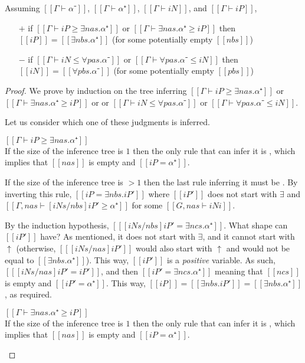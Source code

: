 \begin{corollary}
\begin{lemma}
  \label{lemma:var-subt}
  Assuming $[[Γ ⊢  α⁻]]$, $[[Γ ⊢ α⁺]]$, $[[Γ ⊢ iN]]$, and $[[Γ ⊢ iP]]$,
  \begin{itemize}
  \item[$+$] if $[[Γ ⊢ iP ≥ ∃nas.α⁺]]$ or $[[Γ ⊢ ∃nas.α⁺ ≥ iP ]]$ then $[[iP]] = [[∃nbs.α⁺]]$ (for some potentially empty $[[nbs]]$)
  \item[$-$] if $[[Γ ⊢ iN ≤ ∀pas.α⁻]]$ or $[[Γ ⊢ ∀pas.α⁻ ≤ iN ]]$ then $[[iN]] = [[∀pbs.α⁻]]$ (for some potentially empty $[[pbs]]$)
  \end{itemize}
\end{lemma}
\begin{proof}
  We prove by induction on the tree
  inferring $[[Γ ⊢ iP ≥ ∃nas.α⁺]]$ or $[[Γ ⊢ ∃nas.α⁺ ≥ iP ]]$ or
  or $[[Γ ⊢ iN ≤ ∀pas.α⁻]]$ or $[[Γ ⊢ ∀pas.α⁻ ≤ iN ]]$.

  Let us consider which one of these judgments is inferred.
  \begin{caseof}
  \item $[[Γ ⊢ iP ≥ ∃nas.α⁺]]$\\
    If the size of the inference tree is $1$ then the only rule that can infer
    it is , which
    implies that $[[nas]]$ is empty and $[[iP = α⁺]]$.

    If the size of the inference tree is $>1$ then the last rule inferring
    it must be . By inverting this rule,
    $[[iP = ∃nbs.iP']]$ where $[[iP']]$ does not start with $\exists$ and
    $[[Γ, nas ⊢ [iNs/nbs] iP' ≥ α⁺]]$ for some $[[G, nas ⊢ iNi]]$.

    By the induction hypothesis, $[[ [iNs/nbs] iP' = ∃ncs.α⁺]]$.
    What shape can $[[iP']]$ have?
    As mentioned, it does not start with $\exists$, and it cannot start with
    $\uparrow$ (otherwise, $[[ [iNs/nas] iP' ]]$ would also
    start with $\uparrow$ and would not be equal to $[[∃nbs.α⁺]]$).
    This way, $[[iP']]$ is a \emph{positive} variable. 
    As such, $[[ [iNs/nas] iP' = iP']]$,
    and then $[[iP' = ∃ncs.α⁺]]$ meaning that $[[ncs]]$ is empty and $[[iP' = α⁺]]$.
    This way, $[[iP]] = [[∃nbs.iP']] = [[∃nbs.α⁺]]$, as required.

  \item $[[Γ ⊢ ∃nas.α⁺ ≥ iP]]$\\
    If the size of the inference tree is $1$ then the only rule that can infer
    it is , which
    implies that $[[nas]]$ is empty and $[[iP = α⁺]]$.


\end{caseof}
\end{proof}
\end{corollary}
